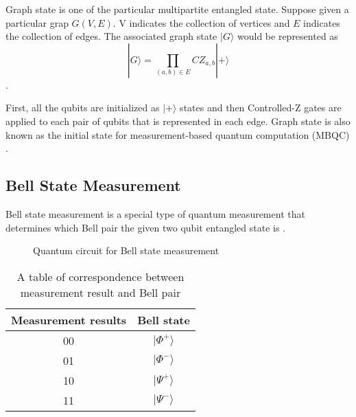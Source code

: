 Graph state is one of the particular multipartite entangled state. Suppose given a particular grap $G(V, E)$.
V indicates the collection of vertices and $E$ indicates the collection of edges.
The associated graph state $|G\rangle$ would be represented as 
\begin{equation}
  |G\rangle = \prod_{(a,b) \in E} CZ_{a,b} |+\rangle
\end{equation}.

First, all the qubits are initialized as $|+ \rangle$ states and then Controlled-Z gates are applied to each pair of qubits that is represented in each edge.
Graph state is also known as the initial state for measurement-based quantum computation (MBQC) \cite{PhysRevLett.86.5188}. 

\subsection{Bell State Measurement}
Bell state measurement is a special type of quantum measurement that determines which Bell pair the given two qubit entangled state is \cite{PhysRevA.59.3295}.

\begin{figure}[ht]
  \begin{center}
\caption{Quantum circuit for Bell state measurement}
\end{center}
\end{figure}

\begin{table}[ht]
  \begin{center}
    \begin{tabular}{|c|c|} \hline
      Measurement results & Bell state \\ \hline \cline{1-2}
      00 &  $|\Phi^+\rangle$ \\ \cline{1-2}
      01 & $|\Phi^-\rangle$ \\  \cline{1-2}
      10 &  $|\Psi^+\rangle$ \\ \cline{1-2}
      11 & $|\Psi^-\rangle$ \\  \hline  \cline{1-2}
    \end{tabular}
    \caption{A table of correspondence between measurement result and Bell pair}
  \end{center}
\end{table}

